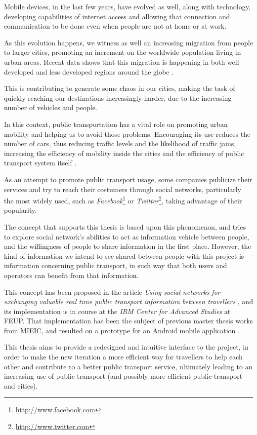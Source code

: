 Mobile devices, in the last few years, have evolved as well, along with technology, developing capabilities of internet access and allowing that connection and communication to be done even when people are not at home or at work.

As this evolution happens, we witness as well an increasing migration from people to larger cities, promoting an increment on the worldwide population living in urban areas. Recent data shows that this migration is happening in both well developed and less developed regions around the globe \cite{kn:NAT11}.

This is contributing to generate some chaos in our cities, making the task of quickly reaching our destinations increasingly harder, due to the increasing number of vehicles and people.

In this context, public transportation has a vital role on promoting urban mobility and helping us to avoid those problems. Encouraging its use reduces the number of cars, thus reducing traffic levels and the likelihood of traffic jams, increasing the efficiency of mobility inside the cities and the efficiency of public transport system itself \cite{kn:CSV11}.

As an attempt to promote public transport usage, some companies publicize their services and try to reach their costumers through social networks, particularly the most widely used, such as \emph{Facebook}\footnote{\url{http://www.facebook.com}} or \emph{Twitter}\footnote{\url{http://www.twitter.com}}, taking advantage of their popularity.

The concept that supports this thesis is based upon this phenomenon, and tries to explore social network's abilities to act as information vehicle between people, and the willingness of people to share information in the first place. However, the kind of information we intend to see shared between people with this project is information concerning public transport, in such way that both users and operators can benefit from that information. 

This concept has been proposed in the article \emph{Using social networks for exchanging valuable real time public transport information between travellers} \cite{kn:NGeCP11}, and its implementation is in course at the \emph{IBM Center for Advanced Studies} at FEUP. That implementation has been the subject of previous master thesis works from MIEIC, and resulted on a prototype for an Android mobile application \cite{kn:eSG12}. 

This thesis aims to provide a redesigned and intuitive interface to the project, in order to make the new iteration a more efficient way for travellers to help each other and contribute to a better public transport service, ultimately leading to an increasing use of public transport (and possibly more efficient public transport and cities). 

